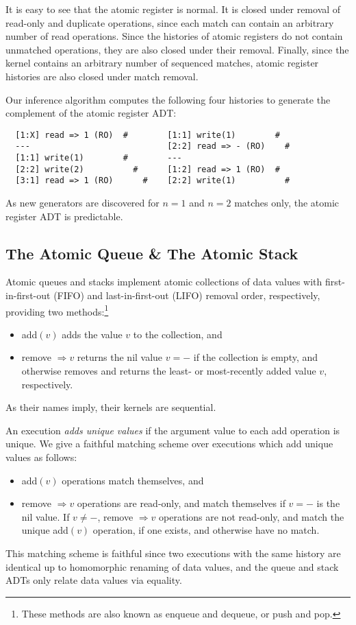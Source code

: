 It is easy to see that the atomic register is normal. It is
closed under removal of read-only and duplicate operations, since  each
match can contain an arbitrary number of read operations. Since the histories
of atomic registers do not contain unmatched operations, they are also closed
under their removal. Finally, since the kernel contains an arbitrary number of
sequenced matches, atomic register histories are also closed under match
removal.

Our inference algorithm computes the following four histories to generate the
complement of the atomic register ADT:
\begin{verbatim}
  [1:X] read => 1 (RO)  #        [1:1] write(1)        #
  ---                            [2:2] read => - (RO)    #
  [1:1] write(1)        #        ---
  [2:2] write(2)          #      [1:2] read => 1 (RO)  #
  [3:1] read => 1 (RO)      #    [2:2] write(1)          #
\end{verbatim}
As new generators are discovered for $n=1$ and $n=2$ matches only, the atomic
register ADT is predictable.

\subsection{The Atomic Queue \& The Atomic Stack}

Atomic queues and stacks implement atomic collections of data values with
first-in-first-out (FIFO) and last-in-first-out (LIFO) removal order,
respectively, providing two methods:\footnote{These methods are also known as
enqueue and dequeue, or push and pop.}
\begin{itemize}

  \item add$(v)$ adds the value $v$ to the collection, and

  \item remove $\Rightarrow v$ returns the nil value $v = -$ if the
  collection is empty, and otherwise removes and returns the least- or
  most-recently added value $v$, respectively.

\end{itemize}
As their names imply, their kernels are sequential.

An execution \emph{adds unique values} if the argument value to each add
operation is unique. We give a faithful matching scheme over executions which
add unique values as follows:
\begin{itemize}

  \item add$(v)$ operations match themselves, and

  \item remove $\Rightarrow v$ operations are read-only, and match themselves
  if $v = -$ is the nil value. If $v \neq -$, remove
  $\Rightarrow v$ operations are not read-only, and match the unique add$(v)$
  operation, if one exists, and otherwise have no match.

\end{itemize}
This matching scheme is faithful since two executions with the same history are
identical up to homomorphic renaming of data values, and the queue and stack
ADTs only relate data values via equality.

